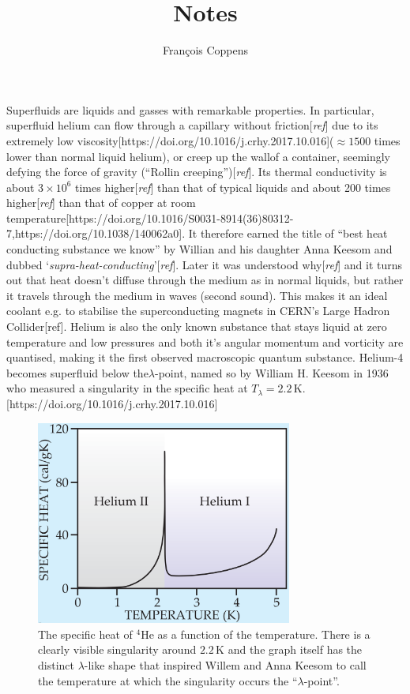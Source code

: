 \documentclass[11pt,a4paper,twoside]{article}
\author{François Coppens}
\title{Notes}
\newcommand{\unit}[1]{\,\mathrm{#1}}
\begin{document}
	Superfluids are liquids and gasses with remarkable properties. In particular, superfluid helium can flow through a capillary without friction[\emph{ref}] due to its extremely low viscosity[https://doi.org/10.1016/j.crhy.2017.10.016]($\approx\!1500$ times lower than normal liquid helium), or creep up the wallof a container, seemingly defying the force of gravity (``Rollin creeping'')[\emph{ref}]. Its thermal conductivity is about $3\times10^6$ times higher[\emph{ref}] than that of typical liquids and about 200 times higher[\emph{ref}] than that of copper at room temperature[https://doi.org/10.1016/S0031-8914(36)80312-7,https://doi.org/10.1038/140062a0]. It therefore earned the title of ``best heat conducting substance we know'' by Willian and his daughter Anna Keesom and dubbed `\emph{supra-heat-conducting}'[\emph{ref}]. Later it was understood why[\emph{ref}] and it turns out that heat doesn't diffuse through the medium as in normal liquids, but rather it travels through the medium in waves (second sound). This makes it an ideal coolant e.g. to stabilise the superconducting magnets in CERN's Large Hadron Collider[ref]. Helium is also the only known substance that stays liquid at zero temperature and low pressures and both it's angular momentum and vorticity are quantised, making it the first observed macroscopic quantum substance. Helium-4 becomes superfluid below the$\lambda$-point, named so by William H. Keesom in 1936 who measured a singularity in the specific heat at $T_\lambda=2.2\unit{K}$.[https://doi.org/10.1016/j.crhy.2017.10.016]\\
	
	\begin{figure}[t]
		\begin{center}
			\includegraphics[width=0.75\textwidth]{specific-heat}
		\end{center}
		\caption{The specific heat of $^4$He as a function of the temperature. There is a clearly visible singularity around $2.2\unit{K}$ and the graph itself has the distinct $\lambda$-like shape that inspired Willem and Anna Keesom to call the temperature at which the singularity occurs the ``$\lambda$-point''.}
		\label{fig:specific-heat}
	\end{figure}	
	
\end{document}
